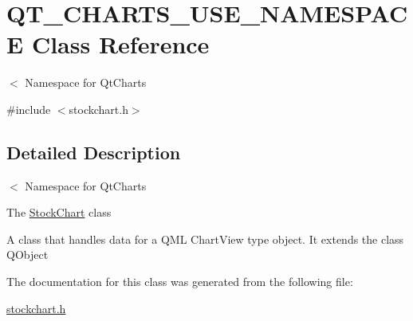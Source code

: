 \hypertarget{class_q_t___c_h_a_r_t_s___u_s_e___n_a_m_e_s_p_a_c_e}{}\section{Q\+T\+\_\+\+C\+H\+A\+R\+T\+S\+\_\+\+U\+S\+E\+\_\+\+N\+A\+M\+E\+S\+P\+A\+CE Class Reference}
\label{class_q_t___c_h_a_r_t_s___u_s_e___n_a_m_e_s_p_a_c_e}


$<$ Namespace for Qt\+Charts  




{\ttfamily \#include $<$stockchart.\+h$>$}



\subsection{Detailed Description}
$<$ Namespace for Qt\+Charts 

The \hyperlink{class_stock_chart}{Stock\+Chart} class

A class that handles data for a Q\+ML Chart\+View type object. It extends the class Q\+Object 

The documentation for this class was generated from the following file\+:\begin{DoxyCompactItemize}
\item 
\hyperlink{stockchart_8h}{stockchart.\+h}\end{DoxyCompactItemize}
